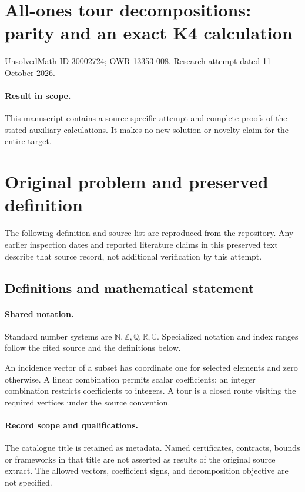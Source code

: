 \documentclass[11pt]{article}
\begin{document}
\section*{All-ones tour decompositions: parity and an exact K4 calculation}
\noindent UnsolvedMath ID 30002724; OWR-13353-008. Research attempt dated 11 October 2026.
\paragraph{Result in scope.}This manuscript contains a source-specific attempt and complete proofs of the stated auxiliary calculations. It makes no new solution or novelty claim for the entire target.
\section{Original problem and preserved definition}
The following definition and source list are reproduced from the repository. Any earlier inspection dates and reported literature claims in this preserved text describe that source record, not additional verification by this attempt.
\subsection{Definitions and mathematical statement}

\paragraph{Shared notation.}Standard number systems are $\mathbb N,\mathbb Z,\mathbb Q,\mathbb R,\mathbb C$. Specialized notation and index ranges follow the cited source and the definitions below.


An incidence vector of a subset has coordinate one for selected elements and zero otherwise. A linear combination permits scalar coefficients; an integer combination restricts coefficients to integers. A tour is a closed route visiting the required vertices under the source convention.
\paragraph{Record scope and qualifications.}
The catalogue title is retained as metadata. Named certificates, contracts, bounds or frameworks in that title are not asserted as results of the original source extract.
The allowed vectors, coefficient signs, and decomposition objective are not specified.
\end{document}
